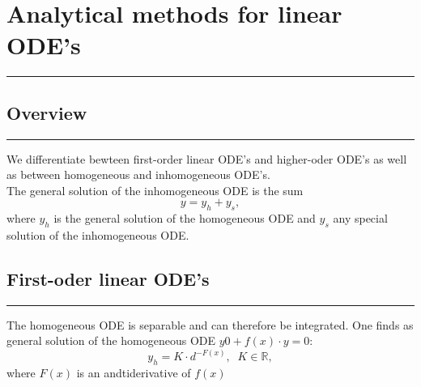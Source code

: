 \section{Analytical methods for linear ODE’s}
\noindent\rule[\linienAbstand]{\linewidth}{\linienDickeDick}

\subsection{Overview}
\noindent\rule[\linienAbstand]{\linewidth}{\linienDicke}
We differentiate bewteen first-order linear ODE's and higher-oder ODE's as well as between homogeneous and inhomogeneous ODE's.\\

The general solution of the inhomogeneous ODE is the sum
\begin{equation}
  y = y_h + y_s,
\end{equation}
where $y_h$ is the general solution of the homogeneous ODE and $y_s$ any special solution of the inhomogeneous ODE.

\subsection{First-oder linear ODE's}
\noindent\rule[\linienAbstand]{\linewidth}{\linienDicke}
The homogeneous ODE is separable and can therefore be integrated. One finds as general solution of the homogeneous ODE $y 0 + f(x) · y = 0$:
\begin{equation}
  y_h = K \cdot d^{-F(x)}, \;\; K \in \mathbb{R},
\end{equation}
where $F(x)$ is an andtiderivative of $f(x)$\\
